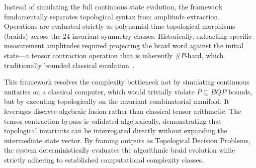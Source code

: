 Instead of simulating the full continuous state evolution, the framework fundamentally separates topological syntax from amplitude extraction. Operations are evaluated strictly as polynomial-time topological morphisms (braids) across the 24 invariant symmetry classes. Historically, extracting specific measurement amplitudes required projecting the braid word against the initial state—a tensor contraction operation that is inherently $\#P$-hard, which traditionally bounded classical emulation~\cite{bernstein1997}. 

This framework resolves the complexity bottleneck not by simulating continuous unitaries on a classical computer, which would trivially violate $P \subseteq BQP$ bounds, but by executing topologically on the invariant combinatorial manifold. It leverages discrete algebraic fusion rather than classical tensor arithmetic. The tensor contraction bypass is validated algebraically, demonstrating that topological invariants can be interrogated directly without expanding the intermediate state vector. By framing outputs as Topological Decision Problems, the system deterministically evaluates the algorithmic braid evolution while strictly adhering to established computational complexity classes.
